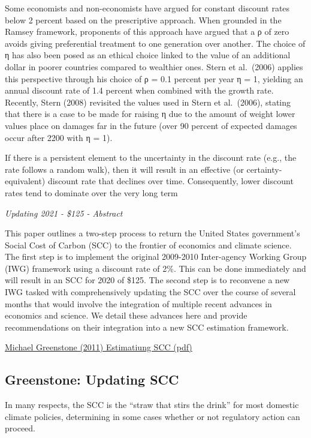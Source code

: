 \documentclass[
]{book}
\begin{document}
Some economists and non-economists have argued for constant discount rates below 2 percent
based on the prescriptive approach. When grounded in the Ramsey framework, proponents of
this approach have argued that a ρ of zero avoids giving preferential treatment to one generation
over another. The choice of η has also been posed as an ethical choice linked to the value of an
additional dollar in poorer countries compared to wealthier ones. Stern et al.~(2006) applies this
perspective through his choice of ρ = 0.1 percent per year η = 1, yielding an annual discount rate
of 1.4 percent when combined with the growth rate. Recently, Stern (2008) revisited the values
used in Stern et al.~(2006), stating that there is a case to be made for raising η due to the amount
of weight lower values place on damages far in the future (over 90 percent of expected damages
occur after 2200 with η = 1).

If there is a persistent element to the uncertainty in the discount rate (e.g., the
rate follows a random walk), then it will result in an effective (or certainty-equivalent) discount
rate that declines over time. Consequently, lower discount rates tend to dominate over the very
long term

\emph{Updating 2021 - \$125 - Abstract}

This paper outlines a two-step process to return the United States government's
Social Cost of Carbon (SCC) to the frontier of economics and climate science.
The first step is to implement the original 2009-2010 Inter-agency Working
Group (IWG) framework using a discount rate of 2\%. This can be done
immediately and will result in an SCC for 2020 of \$125. The second step is to
reconvene a new IWG tasked with comprehensively updating the SCC over the
course of several months that would involve the integration of multiple recent
advances in economics and science. We detail these advances here and provide
recommendations on their integration into a new SCC estimation framework.

\href{pdf/Greenestone_2011_Estimating_SCC.pdf}{Michael Greenstone (2011) Estimatiung SCC (pdf)}

\hypertarget{greenstone-updating-scc}{%
\subsection{Greenstone: Updating SCC}\label{greenstone-updating-scc}}

In many respects, the SCC is the ``straw that stirs the drink'' for most domestic climate
policies, determining in some cases whether or not regulatory action can proceed.
\end{document}
